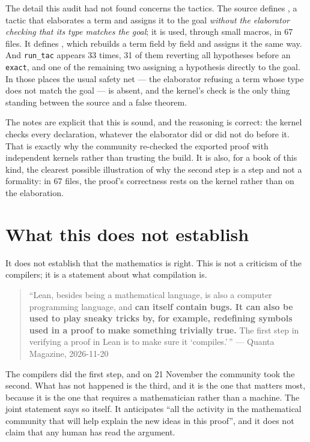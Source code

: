 The detail this audit had not found concerns the tactics. The source defines
, a tactic that elaborates a term and assigns it to the goal
\emph{without the elaborator checking that its type matches the goal}; it is
used, through small macros, in 67 files. It defines , which
rebuilds a term field by field and assigns it the same way. And
\texttt{run\_tac} appears 33 times, 31 of them reverting all hypotheses before
an \texttt{exact}, and one of the remaining two assigning a hypothesis
directly to the goal. In those places the usual safety net --- the elaborator
refusing a term whose type does not match the goal --- is absent, and the
kernel's check is the only thing standing between the source and a false
theorem.

The notes are explicit that this is sound, and the reasoning is correct: the
kernel checks every declaration, whatever the elaborator did or did not do
before it. That is exactly why the community re-checked the exported proof
with independent kernels rather than trusting the build. It is also, for a
book of this kind, the clearest possible illustration of why the second step
is a step and not a formality: in 67 files, the proof's correctness rests on
the kernel rather than on the elaboration.

\section{What this does not establish}It does not establish that the mathematics is right. This is not a criticism of
the compilers; it is a statement about what compilation is.

\begin{quote}
``Lean, besides being a mathematical language, is also a computer programming
language, and \textbf{can itself contain bugs. It can also be used to play
sneaky tricks by, for example, redefining symbols used in a proof to make
something trivially true.} The first step in verifying a proof in Lean is to
make sure it `compiles.'\,''
\qquad --- Quanta Magazine, 2026-11-20
\end{quote}

The compilers did the first step, and on 21 November the community took the
second. What has not happened is the third, and it is the one that matters
most, because it is the one that requires a mathematician rather than a
machine. The joint statement says so itself. It anticipates ``all the activity
in the mathematical community that will help explain the new ideas in this
proof'', and it does not claim that any human has read the argument.

